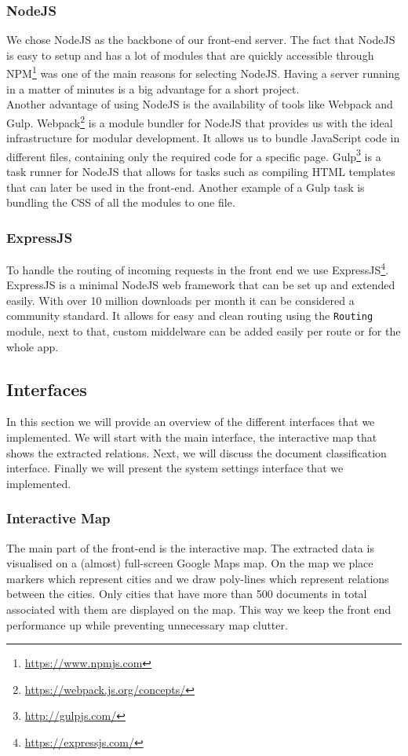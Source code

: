\subsubsection{NodeJS}
We chose NodeJS as the backbone of our front-end server. The fact that NodeJS is easy to setup and has a lot of modules that are quickly accessible through NPM\footnote{\url{https://www.npmjs.com}} was one of the main reasons for selecting NodeJS. Having a server running in a matter of minutes is a big advantage for a short project.\\
Another advantage of using NodeJS is the availability of tools like Webpack and Gulp. Webpack\footnote{\url{https://webpack.js.org/concepts/}} is a module bundler for NodeJS that provides us with the ideal infrastructure for modular development. It allows us to bundle JavaScript code in different files, containing only the required code for a specific page. Gulp\footnote{\url{http://gulpjs.com/}} is a task runner for NodeJS that allows for tasks such as compiling HTML templates that can later be used in the front-end. Another example of a Gulp task is bundling the CSS of all the modules to one file.

\subsubsection{ExpressJS}

To handle the routing of incoming requests in the front end we use ExpressJS\footnote{\url{https://expressjs.com/}}. ExpressJS is a minimal NodeJS web framework that can be set up and extended easily. With over 10 million downloads per month it can be considered a community standard. It allows for easy and clean routing using the \texttt{Routing} module, next to that, custom middelware can be added easily per route or for the whole app.

\subsection{Interfaces}
In this section we will provide an overview of the different interfaces that we implemented. We will start with the main interface, the interactive map that shows the extracted relations. Next, we will discuss the document classification interface. Finally we will present the system settings interface that we implemented.

\subsubsection{Interactive Map}
The main part of the front-end is the interactive map. The extracted data is visualised on a (almost) full-screen Google Maps map. On the map we place markers which represent cities and we draw poly-lines which represent relations between the cities. Only cities that have more than 500 documents in total associated with them are displayed on the map. This way we keep the front end performance up while preventing unnecessary map clutter.

